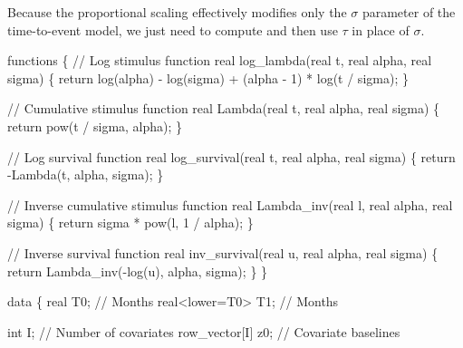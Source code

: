\documentclass[
  letterpaper,
  DIV=11,
  numbers=noendperiod]{scrartcl}
\newenvironment{Shaded}{\begin{snugshade}}{\end{snugshade}}
\newcommand{\CommentTok}[1]{\textcolor[rgb]{0.37,0.37,0.37}{#1}}
\newcommand{\ControlFlowTok}[1]{\textcolor[rgb]{0.00,0.23,0.31}{#1}}
\newcommand{\DataTypeTok}[1]{\textcolor[rgb]{0.68,0.00,0.00}{#1}}
\newcommand{\DecValTok}[1]{\textcolor[rgb]{0.68,0.00,0.00}{#1}}
\newcommand{\KeywordTok}[1]{\textcolor[rgb]{0.00,0.23,0.31}{#1}}
\newcommand{\NormalTok}[1]{\textcolor[rgb]{0.00,0.23,0.31}{#1}}
\begin{document}
Because the proportional scaling effectively modifies only the
\(\sigma\) parameter of the time-to-event model, we just need to compute
and then use \(\tau\) in place of \(\sigma\).

\begin{codelisting}

\caption{\texttt{model4.stan}}

\begin{Shaded}
\begin{Highlighting}[]
\KeywordTok{functions}\NormalTok{ \{}
  \CommentTok{// Log stimulus function}
  \DataTypeTok{real}\NormalTok{ log\_lambda(}\DataTypeTok{real}\NormalTok{ t, }\DataTypeTok{real}\NormalTok{ alpha, }\DataTypeTok{real}\NormalTok{ sigma) \{}
    \ControlFlowTok{return}\NormalTok{ log(alpha) {-} log(sigma) + (alpha {-} }\DecValTok{1}\NormalTok{) * log(t / sigma);}
\NormalTok{  \}}
  
  \CommentTok{// Cumulative stimulus function}
  \DataTypeTok{real}\NormalTok{ Lambda(}\DataTypeTok{real}\NormalTok{ t, }\DataTypeTok{real}\NormalTok{ alpha, }\DataTypeTok{real}\NormalTok{ sigma) \{}
    \ControlFlowTok{return}\NormalTok{ pow(t / sigma, alpha);}
\NormalTok{  \}}

  \CommentTok{// Log survival function}
  \DataTypeTok{real}\NormalTok{ log\_survival(}\DataTypeTok{real}\NormalTok{ t, }\DataTypeTok{real}\NormalTok{ alpha, }\DataTypeTok{real}\NormalTok{ sigma) \{}
    \ControlFlowTok{return}\NormalTok{ {-}Lambda(t, alpha, sigma);}
\NormalTok{  \}}

  \CommentTok{// Inverse cumulative stimulus function}
  \DataTypeTok{real}\NormalTok{ Lambda\_inv(}\DataTypeTok{real}\NormalTok{ l, }\DataTypeTok{real}\NormalTok{ alpha, }\DataTypeTok{real}\NormalTok{ sigma) \{}
    \ControlFlowTok{return}\NormalTok{ sigma * pow(l, }\DecValTok{1}\NormalTok{ / alpha);}
\NormalTok{  \}}
  
  \CommentTok{// Inverse survival function}
  \DataTypeTok{real}\NormalTok{ inv\_survival(}\DataTypeTok{real}\NormalTok{ u, }\DataTypeTok{real}\NormalTok{ alpha, }\DataTypeTok{real}\NormalTok{ sigma) \{}
    \ControlFlowTok{return}\NormalTok{ Lambda\_inv({-}log(u), alpha, sigma);}
\NormalTok{  \}}
\NormalTok{\}}

\KeywordTok{data}\NormalTok{ \{}
  \DataTypeTok{real}\NormalTok{           T0; }\CommentTok{// Months}
  \DataTypeTok{real}\NormalTok{\textless{}}\KeywordTok{lower}\NormalTok{=T0\textgreater{} T1; }\CommentTok{// Months}

  \DataTypeTok{int}\NormalTok{ I;            }\CommentTok{// Number of covariates}
  \DataTypeTok{row\_vector}\NormalTok{[I] z0; }\CommentTok{// Covariate baselines}


\end{Highlighting}
\end{Shaded}
\end{codelisting}
\end{document}

